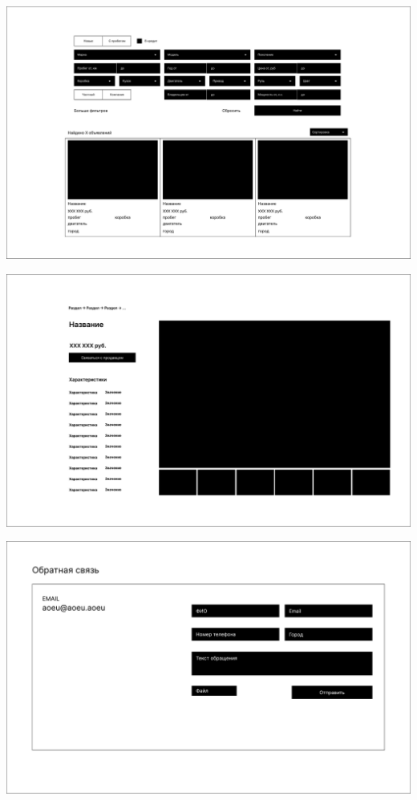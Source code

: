 \noindent
\begin{minipage}{\linewidth}
    \includegraphics[width=\linewidth]{Filter}
\end{minipage}
\bigskip

\noindent
\begin{minipage}{\linewidth}
    \includegraphics[width=\linewidth]{Выбранный авто}
\end{minipage}
\bigskip

\noindent
\begin{minipage}{\linewidth}
    \includegraphics[width=\linewidth]{Контакты}
\end{minipage}
\bigskip

